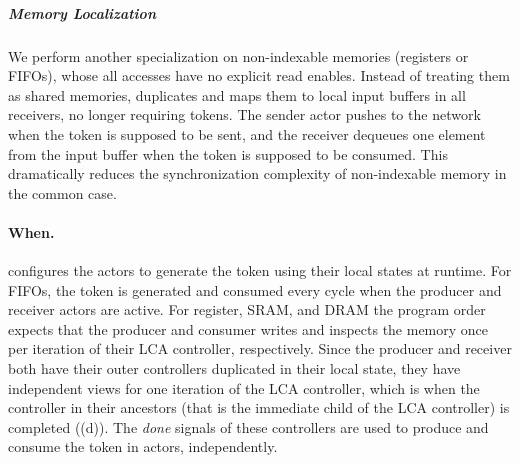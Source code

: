 \subparagraph{Memory Localization}
We perform another specialization on non-indexable memories (registers or FIFOs), whose all accesses have no explicit read enables.
Instead of treating them as shared memories, \name{} duplicates and maps them to local input buffers in all receivers, no longer requiring tokens.
The sender actor pushes to the network when the token is supposed to be sent, and the receiver dequeues one element from the input buffer when the token is supposed to be consumed.
This dramatically reduces the synchronization complexity of non-indexable memory in the common case.

\paragraph{When.}
\name{} configures the actors to generate the token using their local states at runtime.
For FIFOs, the token is generated and consumed every cycle when the producer and receiver actors are active.
For register, SRAM, and DRAM the program order expects that the producer and consumer writes and inspects the memory once per iteration of their LCA controller, respectively.
Since the producer and receiver both have their outer controllers duplicated in their local state, they have independent views for one iteration of the LCA controller, which is when the controller in their ancestors (that is the immediate child of the LCA controller) is completed ((d)).
The {\em done} signals of these controllers are used to produce and consume the token in actors, independently.

